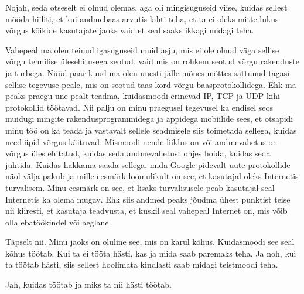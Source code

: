 
Nojah, seda otseselt ei olnud olemas, aga oli mingisuguseid viise, kuidas sellest mööda hiiliti, et  kui andmebaas arvutis lahti teha, et ta ei oleks mitte lukus võrgus kõikide kasutajate jaoks vaid et seal saaks ikkagi midagi teha. 


Vahepeal ma olen teinud igasuguseid muid asju, mis ei ole olnud väga sellise võrgu tehnilise ülesehitusega seotud, vaid mis on rohkem seotud võrgu rakenduste ja turbega. Nüüd paar kuud ma olen uuesti jälle mõnes mõttes sattunud tagasi sellise tegevuse peale, mis on seotud taas kord võrgu baasprotokollidega. Ehk  ma peaks praegu une pealt teadma, kuidasmoodi erinevad IP,  TCP  ja UDP kihi protokollid töötavad. Nii palju on minu praegusel tegevusel ka endisel seos muidugi mingite rakendusprogrammidega ja äppidega  mobiilide sees, et otsapidi minu töö on ka teada ja vastavalt sellele seadmisele siis toimetada sellega, kuidas need äpid võrgus käituvad. Mismoodi nende liiklus on või  andmevahetus on võrgus üles ehitatud, kuidas seda andmevahetust ohjes hoida, kuidas seda juhtida. Kuidas hakkama saada sellega, mida Google pidevalt uute protokollide näol välja pakub ja mille eesmärk loomulikult on see, et kasutajal oleks Internetis turvalisem. Minu eesmärk on see, et lisaks turvalisusele peab kasutajal seal Internetis ka olema mugav. Ehk siis andmed peaks jõudma ühest punktist teise nii kiiresti, et kasutaja teadvusta, et  kuskil seal vahepeal Internet on, mis võib olla ebatöökindel või aeglane.


Täpselt nii. Minu jaoks on oluline see, mis on karul kõhus. Kuidasmoodi see seal kõhus töötab. Kui ta ei tööta hästi, kas ja mida  saab paremaks teha. Ja noh, kui ta töötab hästi, siis  sellest hoolimata kindlasti saab midagi teistmoodi teha.


Jah, kuidas töötab ja miks  ta nii hästi töötab.
